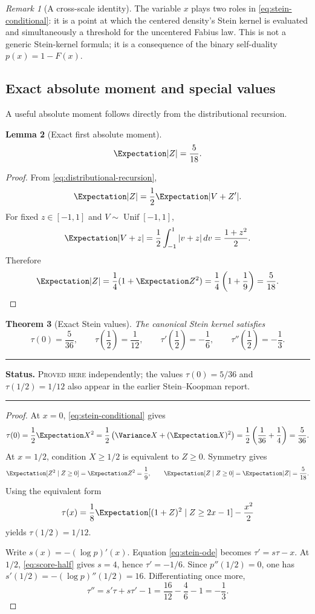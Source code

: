 \documentclass[11pt,oneside]{article}
\newtheorem{theorem}{Theorem}[section]
\newtheorem{lemma}[theorem]{Lemma}
\theoremstyle{definition}
\theoremstyle{remark}
\newtheorem{remark}[theorem]{Remark}
\newenvironment{boxedremark}{%
  \par\smallskip\noindent\begin{center}\begin{minipage}{0.94\textwidth}%
  \color{black}\hrule\vspace{0.6em}\small
}{%
  \vspace{0.6em}\hrule\end{minipage}\end{center}\smallskip
}
\newcommand{\ProvedHere}{\textsc{Proved here}}
\newcommand{\Status}[1]{%
  \begin{boxedremark}\textbf{Status.} #1.\end{boxedremark}}
\begin{document}
\begin{remark}[A cross-scale identity]
The variable $x$ plays two roles in \eqref{eq:stein-conditional}: it is a point at
which the centered density's Stein kernel is evaluated and simultaneously a
threshold for the uncentered Fabius law.  This is not a generic Stein-kernel
formula; it is a consequence of the binary self-duality $p(x)=1-F(x)$.
\end{remark}

\subsection{Exact absolute moment and special values}
A useful absolute moment follows directly from the distributional recursion.

\begin{lemma}[Exact first absolute moment]\label{lem:absolute-moment}
\begin{equation}\label{eq:absolute-moment}
 \Expectation|Z|=\frac5{18}.
\end{equation}
\end{lemma}

\begin{proof}
From \eqref{eq:distributional-recursion},
\[
 \Expectation|Z|=\frac12\Expectation|V+Z'|.
\]
For fixed $z\in[-1,1]$ and $V\sim\operatorname{Unif}[-1,1]$,
\[
 \Expectation|V+z|=\frac12\int_{-1}^1|v+z|\,dv=\frac{1+z^2}{2}.
\]
Therefore
\[
 \Expectation|Z|=\frac14(1+\Expectation Z^2)=\frac14\left(1+\frac19\right)=\frac5{18}.
\]
\end{proof}

\begin{theorem}[Exact Stein values]\label{thm:stein-values}
The canonical Stein kernel satisfies
\begin{equation}\label{eq:stein-values}
 \tau(0)=\frac5{36},\qquad
 \tau\!\left(\frac12\right)=\frac1{12},\qquad
 \tau'\!\left(\frac12\right)=-\frac16,
 \qquad \tau''\!\left(\frac12\right)=-\frac13.
\end{equation}
\end{theorem}
\Status{\ProvedHere{} independently; the values $\tau(0)=5/36$ and
$\tau(1/2)=1/12$ also appear in the earlier Stein--Koopman report}

\begin{proof}
At $x=0$, \eqref{eq:stein-conditional} gives
\[
 \tau(0)=\frac12\Expectation X^2
 =\frac12\left(\Variance X+(\Expectation X)^2\right)
 =\frac12\left(\frac1{36}+\frac14\right)=\frac5{36}.
\]
At $x=1/2$, condition $X\ge1/2$ is equivalent to $Z\ge0$.  Symmetry gives
\[
 \Expectation[Z^2\mid Z\ge0]=\Expectation Z^2=\frac19,
 \qquad \Expectation[Z\mid Z\ge0]=\Expectation|Z|=\frac5{18}.
\]
Using the equivalent form
\[
 \tau(x)=\frac18\Expectation[(1+Z)^2\mid Z\ge2x-1]-\frac{x^2}{2}
\]
yields $\tau(1/2)=1/12$.

Write $s(x)=-(\log p)'(x)$.  Equation \eqref{eq:stein-ode} becomes
$\tau'=s\tau-x$.  At $1/2$, \eqref{eq:score-half} gives $s=4$, hence
$\tau'=-1/6$.  Since $p''(1/2)=0$, one has
$s'(1/2)=-(\log p)''(1/2)=16$.  Differentiating once more,
\[
 \tau''=s'\tau+s\tau'-1
 =\frac{16}{12}-\frac{4}{6}-1=-\frac13.
\]
\end{proof}
\end{document}
